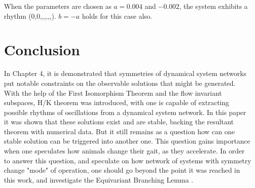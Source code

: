 When the parameters are chosen as $a = 0.004$ and $-0.002$, the system exhibits a rhythm (0,0,,,,,,). $b=-a$ holds for this case also.

\chapter{Conclusion}
In Chapter 4, it is demonstrated that symmetries of dynamical system networks put notable constraints on the observable solutions that might be generated. With the help of the First Isomorphism Theorem and the flow invariant subspaces, H/K theorem was introduced, with one is capable of extracting possible rhythms of oscillations from a dynamical system network. In this paper it was shown that these solutions exist and are stable, backing the resultant theorem with numerical data. But it still remains as a question how can one stable solution can be triggered into another one. This question gains importance when one speculates how animals change their gait, as they accelerate. In order to answer this question, and speculate on how network of systems with symmetry change "mode"  of operation, one should go beyond the point it was reached in this work, and investigate the Equivariant Branching Lemma \cite{golubitsky_symmetry_2003,scholarpedia_bifurcation_theory}.